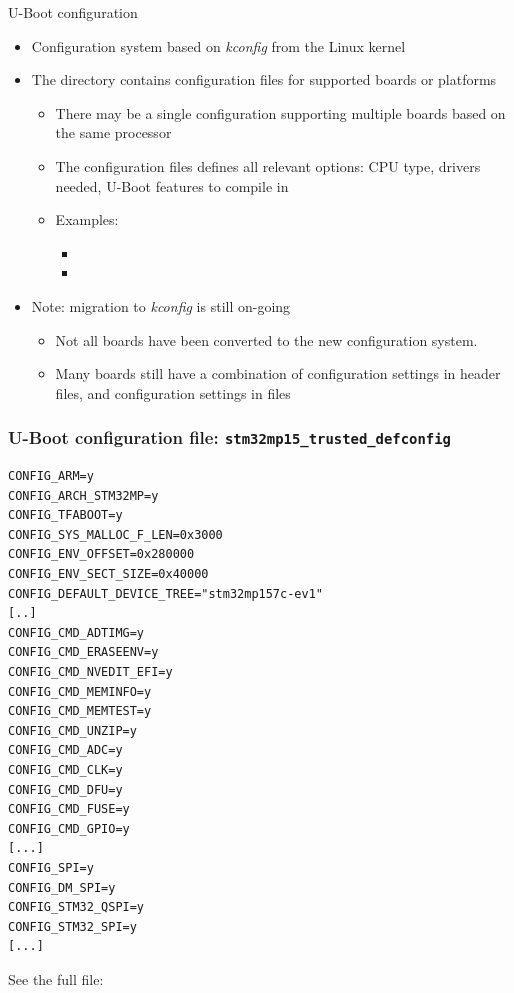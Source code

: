 \begin{frame}{U-Boot configuration}
  \begin{itemize}
  \item Configuration system based on {\em kconfig} from the Linux
    kernel
  \item The  directory contains configuration
    files for supported boards or platforms
    \begin{itemize}
    \item There may be a single configuration supporting multiple
      boards based on the same processor
    \item The configuration files defines all relevant options: CPU
      type, drivers needed, U-Boot features to compile in
    \item Examples:
      \begin{itemize}
      \item {}
      \item {}
      \end{itemize}
    \end{itemize}
  \item Note: migration to {\em kconfig} is still on-going
    \begin{itemize}
    \item Not all boards have been converted to the new configuration
      system.
    \item Many boards still have a combination of configuration
      settings in  header files,
      and configuration settings in  files
    \end{itemize}
  \end{itemize}
\end{frame}

\begin{frame}[fragile]
  \frametitle{U-Boot configuration file: {\tt stm32mp15\_trusted\_defconfig}}
  \begin{block}{}
    {\tiny
\begin{verbatim}
CONFIG_ARM=y
CONFIG_ARCH_STM32MP=y
CONFIG_TFABOOT=y
CONFIG_SYS_MALLOC_F_LEN=0x3000
CONFIG_ENV_OFFSET=0x280000
CONFIG_ENV_SECT_SIZE=0x40000
CONFIG_DEFAULT_DEVICE_TREE="stm32mp157c-ev1"
[..]
CONFIG_CMD_ADTIMG=y
CONFIG_CMD_ERASEENV=y
CONFIG_CMD_NVEDIT_EFI=y
CONFIG_CMD_MEMINFO=y
CONFIG_CMD_MEMTEST=y
CONFIG_CMD_UNZIP=y
CONFIG_CMD_ADC=y
CONFIG_CMD_CLK=y
CONFIG_CMD_DFU=y
CONFIG_CMD_FUSE=y
CONFIG_CMD_GPIO=y
[...]
CONFIG_SPI=y
CONFIG_DM_SPI=y
CONFIG_STM32_QSPI=y
CONFIG_STM32_SPI=y
[...]
\end{verbatim}
    }
  \end{block}
  See the full file: 
\end{frame}

